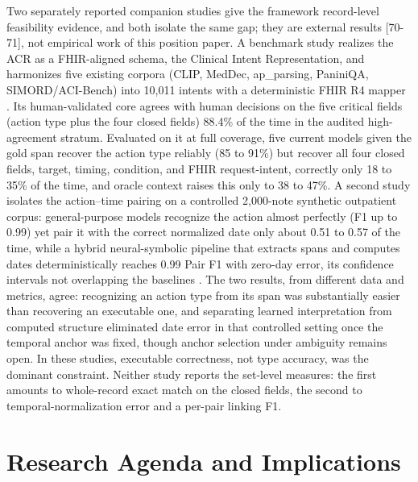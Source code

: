 Two separately reported companion studies give the framework record-level feasibility evidence, and both isolate the same gap; they are external results {[}70-71{]}, not empirical work of this position paper. A benchmark study realizes the ACR as a FHIR-aligned schema, the Clinical Intent Representation, and harmonizes five existing corpora (CLIP, MedDec, ap\_parsing, PaniniQA, SIMORD/ACI-Bench) into 10,011 intents with a deterministic FHIR R4 mapper \cite{ref70}. Its human-validated core agrees with human decisions on the five critical fields (action type plus the four closed fields) 88.4\% of the time in the audited high-agreement stratum. Evaluated on it at full coverage, five current models given the gold span recover the action type reliably (85 to 91\%) but recover all four closed fields, target, timing, condition, and FHIR request-intent, correctly only 18 to 35\% of the time, and oracle context raises this only to 38 to 47\%. A second study isolates the action--time pairing on a controlled 2,000-note synthetic outpatient corpus: general-purpose models recognize the action almost perfectly (F1 up to 0.99) yet pair it with the correct normalized date only about 0.51 to 0.57 of the time, while a hybrid neural-symbolic pipeline that extracts spans and computes dates deterministically reaches 0.99 Pair F1 with zero-day error, its confidence intervals not overlapping the baselines \cite{ref71}. The two results, from different data and metrics, agree: recognizing an action type from its span was substantially easier than recovering an executable one, and separating learned interpretation from computed structure eliminated date error in that controlled setting once the temporal anchor was fixed, though anchor selection under ambiguity remains open. In these studies, executable correctness, not type accuracy, was the dominant constraint. Neither study reports the set-level measures: the first amounts to whole-record exact match on the closed fields, the second to temporal-normalization error and a per-pair linking F1.

\section{Research Agenda and Implications}\label{research-agenda-and-implications}

